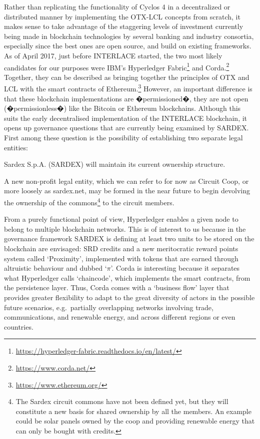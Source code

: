 Rather than replicating the functionality of Cyclos 4 in a decentralized or distributed manner by implementing the OTX-LCL concepts from scratch, it makes sense to take advantage of the staggering levels of investment currently being made in blockchain technologies by several banking and industry consortia, especially since the best ones are open source, and build on existing frameworks. As of April 2017, just before INTERLACE started, the two most likely candidates for our purposes were IBM's Hyperledger Fabric\footnote{\url{https://hyperledger-fabric.readthedocs.io/en/latest/}}\cite{Cachin2016} and Corda.\footnote{\url{https://www.corda.net/}} Together, they can be described as bringing together the principles of OTX and LCL with the smart contracts of Ethereum.\footnote{\url{https://www.ethereum.org/}} However, an important difference is that these blockchain implementations are �permissioned�, they are not open (�permissionless�) like the Bitcoin or Ethereum blockchains. Although this suits the early decentralised implementation of the INTERLACE blockchain, it opens up governance questions that are currently being examined by SARDEX. First among these question is the possibility of establishing two separate legal entities:
\begin{packed_item1}
\item Sardex S.p.A. (SARDEX) will maintain its current ownership structure.
\item A new non-profit legal entity, which we can refer to for now as Circuit Coop, or more loosely as sardex.net, may be formed in the near future to begin devolving the ownership of the commons\footnote{The Sardex circuit commons have not been defined yet, but they will constitute a new basis for shared ownership by all the members. An example could be solar panels owned by the coop and providing renewable energy that can only be bought with credits.} to the circuit members.
\end{packed_item1}

From a purely functional point of view, Hyperledger enables a given node to belong to multiple blockchain networks. This is of interest to us because in the governance framework SARDEX is defining at least two units to be stored on the blockchain are envisaged: SRD credits and a new meritocratic reward points system called `Proximity', implemented with tokens that are earned through altruistic behaviour and dubbed `$\pi$'. Corda is interesting because it separates what Hyperledger calls `chaincode', which implements the smart contracts, from the persistence layer. Thus, Corda comes with a `business flow' layer that provides greater flexibility to adapt to the great diversity of actors in the possible future scenarios, e.g.\ partially overlapping networks involving trade, communications, and renewable energy, and across different regions or even countries.

